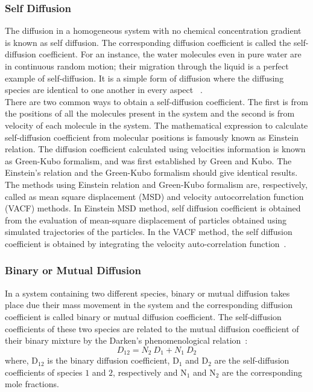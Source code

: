     \subsubsection{Self Diffusion}
        The diffusion in a homogeneous system with no chemical concentration gradient is known as self diffusion. The corresponding diffusion coefficient is called the self-diffusion coefficient. For an instance, the water molecules even in pure water are in continuous random motion; their migration through the liquid is a perfect example of self-diffusion. It is a simple form of diffusion where the diffusing species are identical to one another in every aspect ~\citep{mehrer2009, heitjans2006}.\\
        \noindent There are two common ways to obtain a self-diffusion coefficient. The
        first is from the positions of all the molecules present in the system and the second
        is from velocity of each molecule in the system. The mathematical expression to
        calculate self-diffusion coefficient from molecular positions is famously known as
        Einstein relation. The diffusion coefficient calculated using velocities information is known as Green-Kubo formalism, and was first established by Green and Kubo. The Einstein's relation and the Green-Kubo formalism should give identical results. The methods using Einstein relation and  Green-Kubo formalism  are, respectively, called as mean square displacement (MSD) and velocity autocorrelation function (VACF) methods.  In Einstein MSD method, self diffusion coefficient is obtained from the evaluation of  mean-square displacement of particles obtained using simulated trajectories of the particles. In the VACF method, the self diffusion coefficient is obtained by integrating the velocity auto-correlation function~\citep{Allen1989, Frenkel2002}.     
    \subsubsection{Binary or Mutual Diffusion}
    In a system containing two different species, binary or mutual diffusion takes place
    due their mass movement in the system and the corresponding diffusion coefficient is
    called binary or mutual diffusion coefficient. The self-diffusion coefficients of these
    two species are related to the mutual diffusion coefficient of their binary mixture by
    the Darken's phenomenological relation~\citep{darken1948}:
    \begin{equation}
    \label{darken}
    D_{12} = N_{2}~D_{1} + N_{1}~D_{2}
    \end{equation}
       where, D$_{12}$ is the binary diffusion coefficient, D$_{1}$ and D$_{2}$ are the self-diffusion coefficients of species $1$ and $2$, respectively and   N$_{1}$  and N$_{2}$  are the corresponding mole fractions.
